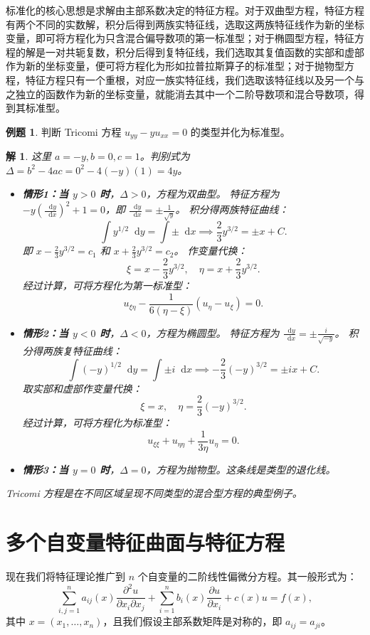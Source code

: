 \documentclass[12pt,a4paper]{article}
\newcommand{\diff}{\mathop{}\!\mathrm{d}}
\numberwithin{subsection}{section}
\numberwithin{subsubsection}{subsection}
\theoremstyle{plain}
\newtheorem{solution}{解}[subsection]
\theoremstyle{definition}
\newtheorem{example}{例题}[subsection]
\theoremstyle{remark}
\begin{document}
标准化的核心思想是求解由主部系数决定的特征方程。对于双曲型方程，特征方程有两个不同的实数解，积分后得到两族实特征线，选取这两族特征线作为新的坐标变量，即可将方程化为只含混合偏导数项的第一标准型；对于椭圆型方程，特征方程的解是一对共轭复数，积分后得到复特征线，我们选取其复值函数的实部和虚部作为新的坐标变量，便可将方程化为形如拉普拉斯算子的标准型；对于抛物型方程，特征方程只有一个重根，对应一族实特征线，我们选取该特征线以及另一个与之独立的函数作为新的坐标变量，就能消去其中一个二阶导数项和混合导数项，得到其标准型。


	\begin{example}
		判断 Tricomi 方程 \(u_{yy} - y u_{xx} = 0\) 的类型并化为标准型。
	\end{example}
	\begin{solution}
		这里 \(a=-y, b=0, c=1\)。判别式为 \(\Delta = b^2-4ac = 0^2 - 4(-y)(1) = 4y\)。
		\begin{itemize}
			\item \textbf{情形1：当 \(y > 0\) 时}，\(\Delta > 0\)，方程为双曲型。
			特征方程为 \(-y (\frac{\diff y}{\diff x})^2 + 1 = 0\)，即 \(\frac{\diff y}{\diff x} = \pm \frac{1}{\sqrt{y}}\)。
			积分得两族特征曲线：
			\[
			\int y^{1/2} \diff y = \int \pm \diff x \implies \frac{2}{3}y^{3/2} = \pm x + C.
			\]
			即 \( x - \frac{2}{3}y^{3/2} = c_1 \) 和 \( x + \frac{2}{3}y^{3/2} = c_2 \)。
			作变量代换：
			\[ \xi = x - \frac{2}{3}y^{3/2}, \quad \eta = x + \frac{2}{3}y^{3/2}. \]
			经过计算，可将方程化为第一标准型：
			\[ u_{\xi\eta} - \frac{1}{6(\eta-\xi)}(u_\eta - u_\xi) = 0. \]
			
			\item \textbf{情形2：当 \(y < 0\) 时}，\(\Delta < 0\)，方程为椭圆型。
			特征方程为 \(\frac{\diff y}{\diff x} = \pm \frac{i}{\sqrt{-y}}\)。
			积分得两族复特征曲线：
			\[
			\int (-y)^{1/2} \diff y = \int \pm i \diff x \implies -\frac{2}{3}(-y)^{3/2} = \pm ix + C.
			\]
			取实部和虚部作变量代换：
			\[ \xi = x, \quad \eta = \frac{2}{3}(-y)^{3/2}. \]
			经过计算，可将方程化为标准型：
			\[ u_{\xi\xi} + u_{\eta\eta} + \frac{1}{3\eta}u_\eta = 0. \]
			
			\item \textbf{情形3：当 \(y = 0\) 时}，\(\Delta = 0\)，方程为抛物型。这条线是类型的退化线。
		\end{itemize}
		Tricomi 方程是在不同区域呈现不同类型的混合型方程的典型例子。
	\end{solution}
	
	\newpage
	\section{多个自变量特征曲面与特征方程}
	现在我们将特征理论推广到 \(n\) 个自变量的二阶线性偏微分方程。其一般形式为：
	\begin{equation}\label{eq:pde_n_vars}
		\sum_{i,j=1}^{n} a_{ij}(x) \frac{\partial^2 u}{\partial x_i \partial x_j} + \sum_{i=1}^{n} b_i(x) \frac{\partial u}{\partial x_i} + c(x) u = f(x),
	\end{equation}
	其中 \(x=(x_1, \dots, x_n)\)，且我们假设主部系数矩阵是对称的，即 \(a_{ij} = a_{ji}\)。
	
\end{document}

